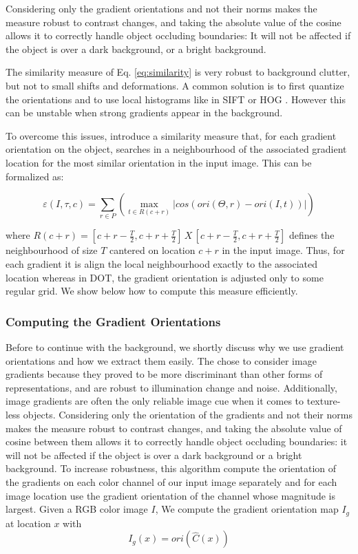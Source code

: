 Considering only the gradient orientations and not their norms makes the measure
robust to contrast changes, and taking the absolute value of the cosine allows it
to correctly handle object occluding boundaries: It will not be affected if the object 
is over a dark background, or a bright background.

The similarity measure of Eq. \ref{eq:similarity} is very robust to background clutter,
but not to small shifts and deformations. A common solution is to first
quantize the orientations and to use local histograms like in SIFT \citet{Lowe2004} 
or HOG \citet{Dalal2005}. However this can be unstable when strong gradients appear 
in the background.

To overcome this issues, \citet{Hinterstoisser2011} introduce a similarity measure
that, for each gradient orientation on the object, searches in a neighbourhood of
the associated gradient location for the most similar orientation in the input image.
This can be formalized as:


\begin{equation}
\label{eq:newsimilarity}
\varepsilon(I, \tau, c) = \sum_{r \in P}\left( \max\limits_{t \in R(c+r)}\left|cos(ori(\Theta,r) - ori(I,t))\right|\right)
\end{equation}

where $R(c+r)=[c+r-\frac{T}{2}, c+r+\frac{T}{2}]\,X\,[c+r-\frac{T}{2}, c+r+\frac{T}{2}]$
defines the neighbourhood of size $T$ cantered on location $c+r$ in the input image.
Thus, for each gradient it is align the local neighbourhood exactly to the associated 
location whereas in DOT, the gradient orientation is adjusted only to some regular grid. 
We show below how to compute this measure efficiently.

\subsubsection{Computing the Gradient Orientations}
Before to continue with the background, we shortly discuss why we use gradient orientations 
and how we extract them easily.
The chose to consider image gradients because they proved to be more discriminant than
other forms of representations, and are robust to illumination change and noise. Additionally,
 image gradients are often the only reliable image cue when it comes to 
texture-less objects. Considering only the orientation of the gradients and not their
norms makes the measure robust to contrast changes, and taking the absolute value of
cosine between them allows it to correctly handle object occluding boundaries: it will 
not be affected if the object is over a dark background or a bright background.
To increase robustness, this algorithm compute the orientation of the gradients on
each color channel of our input image separately and for each image location use the 
gradient orientation of the channel whose magnitude is largest. Given a RGB color image $I$, 
We compute the gradient orientation map $I_g$ at location $x$ with
\begin{equation}
I_g(x)=ori(\hat{C}(x))
\end{equation}

